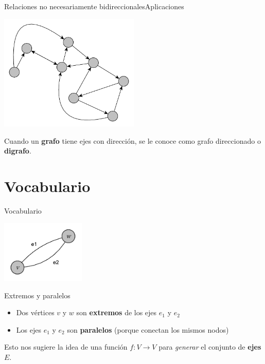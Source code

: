 \documentclass[spanish, c]{beamer}
\begin{document}
\begin{frame}{Relaciones no necesariamente bidireccionales}{Aplicaciones}
    \begin{center}
        \includegraphics[width=0.5\textwidth]{digraph01.pdf}
    \end{center}

    \bigskip

    Cuando un \textbf{grafo} tiene ejes con dirección, se le conoce como \alert{grafo direccionado} o \textbf{digrafo}.
\end{frame}

\section{Vocabulario}

\begin{frame}{Vocabulario}
    \begin{center}
        \includegraphics[width=0.3\textwidth]{extremes.pdf}
    \end{center}

    \begin{block}{Extremos y paralelos}
        \begin{itemize}
            \item Dos vértices $v$ y $w$ son \textbf{extremos} de los ejes $e_1$ y $e_2$
            \item Los ejes $e_1$ y $e_2$ son \textbf{paralelos} (porque conectan los mismos nodos)
        \end{itemize}
    \end{block}

    \bigskip

    Esto nos sugiere la idea de una función $f: V \to V$ para \textit{generar} el conjunto de \textbf{ejes} $E$.
\end{frame}
\end{document}
